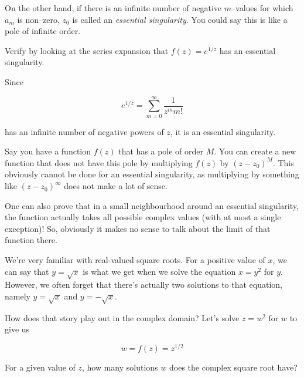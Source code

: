 On the other hand, if there is an infinite number of negative $m$--values for which $a_m$ is non--zero, $z_0$ is called an \emph{essential singularity}. You could say this is like a pole of infinite order.

\begin{cue}
  Verify by looking at the series expansion that $f(z)=e^{1/z}$ has an essential singularity.  
\end{cue}

Since

$$e^{1/z} = \sum_{m=0}^{\infty} \frac{1}{z^m m!} $$

has an infinite number of negative powers of $z$, it is an essential singularity.

Say you have a function $f(z)$ that has a pole of order $M$. You can create a new function that does not have this pole by multiplying $f(z)$ by $(z-z_0)^M$. This obviously cannot be done for an essential singularity, as multiplying by something like $(z-z_0)^\infty$ does not make a lot of sense.

\noindent{}One can also prove that in a small neighbourhood around an essential singularity, the function actually takes all possible complex values (with at most a single exception)! So, obviously it makes no sense to talk about the limit of that function there.


We're very familiar with real-valued square roots. For a positive value of $x$, we can say that $y = \sqrt{x}$ is what we get when we solve the equation $x=y^2$ for $y$. However, we often forget that there's actually two solutions to that equation, namely $y = \sqrt{x}$ and $y = -\sqrt{x}$.

\noindent{}How does that story play out in the complex domain? Let's solve $z=w^2$ for $w$ to give us

\begin{equation}
w = f(z) = z^{1/2} \label{eq-sqrt}
\end{equation}

\begin{cue}
For a given value of $z$, how many solutions $w$ does the complex square root have? 
\end{cue}

